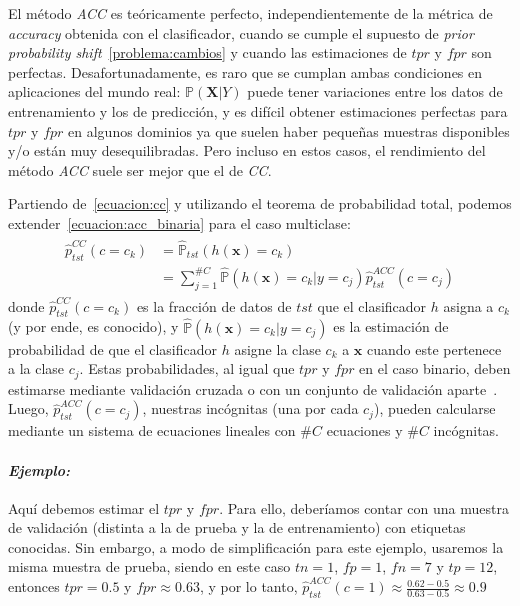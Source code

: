 El método {\it ACC\/} es teóricamente perfecto, independientemente de la métrica
de {\it accuracy\/} obtenida con el clasificador, cuando se cumple el supuesto
de {\it prior probability shift\/}~\ref{problema:cambios} y cuando las
estimaciones de $tpr$ y $fpr$ son perfectas. Desafortunadamente, es raro que se
cumplan ambas condiciones en aplicaciones del mundo real:
$\mathbb{P}(\boldsymbol{X}|Y)$ puede tener variaciones entre los datos de
entrenamiento y los de predicción, y es difícil obtener estimaciones perfectas
para $tpr$ y $fpr$ en algunos dominios ya que suelen haber pequeñas muestras
disponibles y/o están muy desequilibradas. Pero incluso en estos casos, el
rendimiento del método {\it ACC\/} suele ser mejor que el de {\it CC}.

Partiendo de~\ref{ecuacion:cc} y utilizando el teorema de probabilidad total,
podemos extender~\ref{ecuacion:acc_binaria} para el caso multiclase:
\begin{align}
\begin{split}
    \hat p^{CC}_{tst}(c=c_k) &= \mathbb{\hat P}_{tst}(h(\boldsymbol{x})=c_k) \\
    &= \sum \limits_{j=1}^{\#C}{\mathbb{\hat P}(h(\boldsymbol{x})=c_k|y=c_j) \hat p^{ACC}_{tst}(c=c_j)}\label{ecuacion:acc_multiclase}
\end{split}
\end{align}
donde $\hat p^{CC}_{tst}(c=c_k)$ es la fracción de datos de $tst$ que el
clasificador $h$ asigna a $c_k$ (y por ende, es conocido), y
$\mathbb{\hat{P}}(h(\boldsymbol{x})=c_k|y=c_j)$ es la estimación de probabilidad
de que el clasificador $h$ asigne la clase $c_k$ a $\boldsymbol{x}$ cuando este
pertenece a la clase $c_j$. Estas probabilidades, al igual que $tpr$ y $fpr$ en
el caso binario, deben estimarse mediante validación cruzada o con un conjunto
de validación aparte~\cite{barranquero2013study, forman2005counting,
forman2008quantifying}. Luego, $\hat p^{ACC}_{tst}(c=c_j)$, nuestras incógnitas
(una por cada $c_j$), pueden calcularse mediante un sistema de ecuaciones
lineales con $\#C$ ecuaciones y $\#C$ incógnitas.

\paragraph{\it Ejemplo:\/} Aquí debemos estimar el $tpr$ y $fpr$. Para ello,
deberíamos contar con una muestra de validación (distinta a la de prueba y la de
entrenamiento) con etiquetas conocidas. Sin embargo, a modo de simplificación
para este ejemplo, usaremos la misma muestra de prueba, siendo en este caso
$tn=1$, $fp=1$, $fn=7$ y $tp=12$, entonces $tpr=0.5$ y $fpr \approx 0.63$, y por
lo tanto, $\hat p^{ACC}_{tst}(c=1) \approx \frac{0.62-0.5}{0.63-0.5} \approx
0.9$

